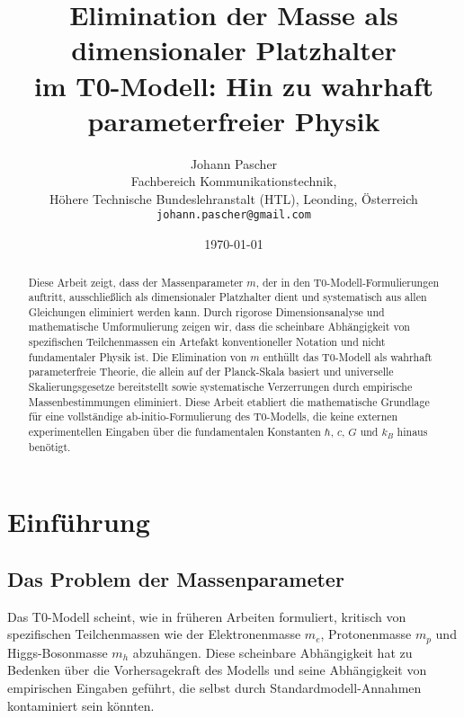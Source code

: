 \documentclass[12pt,a4paper]{article}
\begin{document}
	
	\title{Elimination der Masse als dimensionaler Platzhalter \\
		im T0-Modell: Hin zu wahrhaft parameterfreier Physik}
	\author{Johann Pascher\\
		Fachbereich Kommunikationstechnik, \\Höhere Technische Bundeslehranstalt (HTL), Leonding, Österreich\\
		\texttt{johann.pascher@gmail.com}}
	\date{\today}
	
	\maketitle
	
	\begin{abstract}
		Diese Arbeit zeigt, dass der Massenparameter $m$, der in den T0-Modell-Formulierungen auftritt, ausschließlich als dimensionaler Platzhalter dient und systematisch aus allen Gleichungen eliminiert werden kann. Durch rigorose Dimensionsanalyse und mathematische Umformulierung zeigen wir, dass die scheinbare Abhängigkeit von spezifischen Teilchenmassen ein Artefakt konventioneller Notation und nicht fundamentaler Physik ist. Die Elimination von $m$ enthüllt das T0-Modell als wahrhaft parameterfreie Theorie, die allein auf der Planck-Skala basiert und universelle Skalierungsgesetze bereitstellt sowie systematische Verzerrungen durch empirische Massenbestimmungen eliminiert. Diese Arbeit etabliert die mathematische Grundlage für eine vollständige ab-initio-Formulierung des T0-Modells, die keine externen experimentellen Eingaben über die fundamentalen Konstanten $\hbar$, $c$, $G$ und $k_B$ hinaus benötigt.
	\end{abstract}
	
	\tableofcontents
	\newpage
	
	\section{Einführung}
	\label{sec:introduction}
	
	\subsection{Das Problem der Massenparameter}
	\label{subsec:mass_problem}
	
	Das T0-Modell scheint, wie in früheren Arbeiten formuliert, kritisch von spezifischen Teilchenmassen wie der Elektronenmasse $m_e$, Protonenmasse $m_p$ und Higgs-Bosonmasse $m_h$ abzuhängen. Diese scheinbare Abhängigkeit hat zu Bedenken über die Vorhersagekraft des Modells und seine Abhängigkeit von empirischen Eingaben geführt, die selbst durch Standardmodell-Annahmen kontaminiert sein könnten.
	
\end{document}
